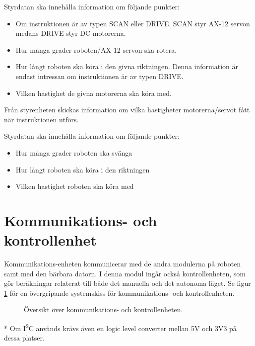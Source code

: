 \documentclass[a4paper,11pt]{article}
\begin{document}
Styrdatan ska innehålla information om följande punkter:
\begin{itemize}
	\item Om instruktionen är av typen SCAN eller DRIVE. SCAN styr AX-12 servon medans DRIVE styr DC motorerna.
	\item Hur många grader roboten/AX-12 servon ska rotera.
	\item Hur långt roboten ska köra i den givna riktningen. Denna information är endast intressan om instruktionen är av typen DRIVE.
	\item Vilken hastighet de givna motorerna ska köra med.
\end{itemize}

Från styrenheten skickas information om vilka hastigheter motorerna/servot fått när instruktionen utförs.

Styrdatan ska innehålla information om följande punkter:
\begin{itemize}
	\item Hur många grader roboten ska svänga
	\item Hur långt roboten ska köra i den riktningen
	\item Vilken hastighet roboten ska köra med
\end{itemize}

\newpage
\section{Kommunikations- och kontrollenhet} \label{sec:system3}
Kommunikations-enheten kommunicerar med de andra modulerna på roboten samt med den bärbara datorn. I denna modul ingår också kontrollenheten, som gör beräkningar relaterat till både det manuella och det autonoma läget. Se figur \ref{fig:unitBrain} för en övergripande systemskiss för kommunikations- och kontrollenheten.
\begin{figure}[h!]
    \caption{Översikt över kommunikations- och kontrollenheten.  }
    \label{fig:unitBrain}
\end{figure}
\noindent \begin{small}
* Om I\textsuperscript{2}C används krävs även en logic level converter mellan 5V och 3V3 på dessa platser.
\end{small}
\end{document}
